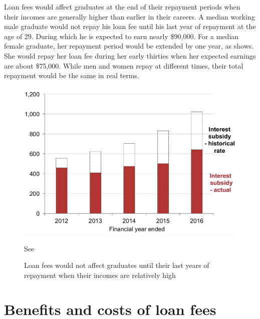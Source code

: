 \documentclass[embargoed]{grattan}
\begin{document}
Loan fees would affect graduates at the end of their repayment periods when their incomes are generally higher than earlier in their careers.
A median working male graduate would not repay his loan fee until his last year of repayment at the age of 29.
During which he is expected to earn nearly \$90,000.
For a median female graduate, her repayment period would be extended by one year, as  shows.
She would repay her loan fee during her early thirties when her expected earnings are about \$75,000.
While men and women repay at different times, their total repayment would be the same in real terms.

\begin{figure}
\caption{Loan fees would not affect graduates until their last years of repayment when their incomes are relatively high}\label{fig:fig21-loan-fees-would-not-affect-grads-until-their-last-years-of-repayment-when-their-incomes-are-relatively-high}


\includegraphics[page=21]{atlas/Chartpack.pdf}

{See }
\end{figure}

\section{Benefits and costs of loan fees}\label{sec:benefits-and-costs-of-loan-fees}
\end{document}
